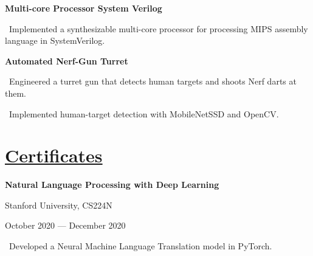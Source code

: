 \documentclass{article}
\begin{document}
\begin{minipage}[t][0pt]{8in\linewidth}
\begin{minipage}[t]{3.1in\linewidth\hspace{2.8em}}
    \vspace{0.4em}

    \small\bfseries\textrm{Multi-core Processor System Verilog}
    
    \vspace{0.3em}
    \small\mdseries
    \hspace{0em}\textasteriskcentered \, \mdseries\textrm{Implemented a synthesizable multi-core processor for processing MIPS assembly language in SystemVerilog.}
    \vspace{0.8em}
    
    \small\bfseries\textrm{Automated Nerf-Gun Turret}
    
    \vspace{0.3em}
    \small\mdseries
    \hspace{0em}\textasteriskcentered \, \mdseries\textrm Engineered a turret gun that detects human targets and shoots Nerf darts at them.

    \vspace{0.5em}
    \small\mdseries
    \hspace{0em}\textasteriskcentered \, \mdseries\textrm Implemented human-target detection with MobileNetSSD and OpenCV.

    \vspace{0.5em}     
    \section{\underline{Certificates}}
        \begin{minipage}[t]{3.3in\textwidth\hspace{0in}}    
            
            \vspace{-1.5em}        
            \mdseries\bfseries{Natural Language Processing with Deep Learning}
            
            \hspace{0.4em}\small\mdseries\textrm Stanford University, CS224N
            
            \hspace{0.4em}\small\mdseries\textrm October 2020 — December 2020
            
            \small\mdseries
            \vspace{0.4em}
            \hspace{1em}\textasteriskcentered \, \mdseries\textrm{Developed a Neural Machine Language Translation model in PyTorch.}
            

\end{minipage}
\end{minipage}
\end{minipage}
\end{document}
